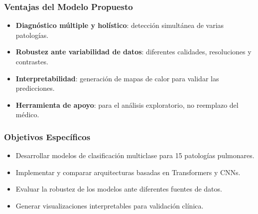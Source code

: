 \begin{frame}
\frametitle{Ventajas del Modelo Propuesto}
\begin{itemize}
    \item \textbf{Diagnóstico múltiple y holístico}: detección simultánea de varias patologías.
    \item \textbf{Robustez ante variabilidad de datos}: diferentes calidades, resoluciones y contrastes.
    \item \textbf{Interpretabilidad}: generación de mapas de calor para validar las predicciones.
    \item \textbf{Herramienta de apoyo}: para el análisis exploratorio, no reemplazo del médico.
\end{itemize}
\end{frame}

\begin{frame}
\frametitle{Objetivos Específicos}
\begin{itemize}
    \item Desarrollar modelos de clasificación multiclase para 15 patologías pulmonares.
    \item Implementar y comparar arquitecturas basadas en Transformers y CNNs.
    \item Evaluar la robustez de los modelos ante diferentes fuentes de datos.
    \item Generar visualizaciones interpretables para validación clínica.
\end{itemize}
\end{frame}
